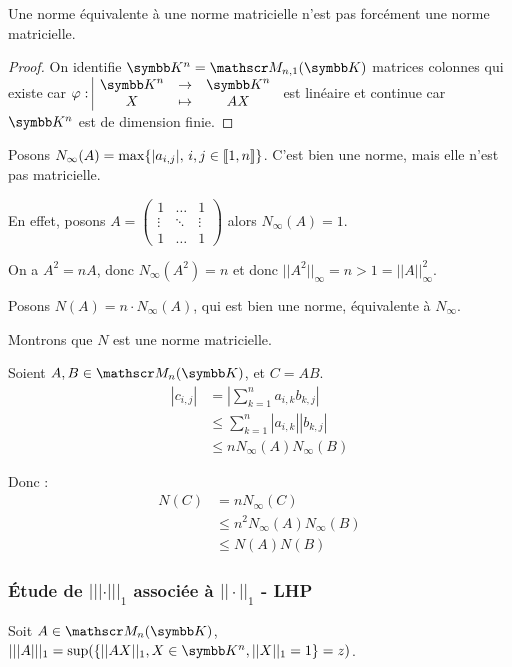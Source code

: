 \begin{remarque}
    Une norme équivalente à une norme matricielle n'est pas forcément une norme matricielle.
\end{remarque}

\begin{proof}
    On identifie $\K^n = \mathscr M_{n, 1}(\K)$ matrices colonnes qui existe 
    car $\fonction{\varphi}{\K^n}{\K^n}{X}{AX}$ est linéaire et continue car $\K^n$ est de dimension finie. 
\end{proof}

\begin{exemple}
    Posons $N_\infty(A) = \max\{ |a_{i, j}|, \, i, j \in [\![1, n]\!]\}$. 
    C'est bien une norme, mais elle n'est pas matricielle. 

    En effet, posons 
    $A = \begin{pmatrix}
        1 & \dots & 1 \\
        \vdots & \ddots & \vdots \\
        1 & \dots & 1
    \end{pmatrix}$ alors $N_\infty(A) = 1$.

    On a $A^2 = nA$, donc $N_\infty(A^2) = n$ et donc $||A^2||_\infty = n > 1 = ||A||_\infty^2$. 

    \lvspace Posons $N(A) = n \cdot N_\infty(A)$, qui est bien une norme, équivalente à $N_\infty$.

    Montrons que $N$ est une norme matricielle.

    Soient $A, B \in \mathscr M_n(\K)$, et $C = AB$. 
    \begin{align*}
        |c_{i, j}| & = \left| \sum_{k=1}^n a_{i, k} b_{k, j} \right| \\
        & \leqslant \sum_{k=1}^n |a_{i, k}| |b_{k, j}| \\
        & \leqslant n N_\infty(A) N_\infty(B)
    \end{align*}

    Donc :
    \begin{align*}
        N(C) & = n N_\infty(C) \\
        & \leqslant n^2 N_\infty(A) N_\infty(B) \\
        &  \leqslant N(A) N(B)
    \end{align*}
\end{exemple}

\subsubsection{Étude de $||| \cdot |||_1$ associée à $|| \cdot ||_1$ - LHP}
Soit $A \in \mathscr M_n(\K)$, $|||A|||_1 = \sup (\{ ||AX||_1, X \in \K^n, ||X||_1 = 1 \} = z) $.

